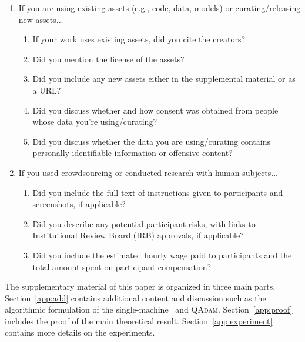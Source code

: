 \documentclass[11pt]{article}
\begin{document}
\begin{enumerate}
\item If you are using existing assets (e.g., code, data, models) or curating/releasing new assets...
\begin{enumerate}
  \item If your work uses existing assets, did you cite the creators?
    \answerYes{}
  \item Did you mention the license of the assets?
    \answerNA{}
  \item Did you include any new assets either in the supplemental material or as a URL?
    \answerNA{}
  \item Did you discuss whether and how consent was obtained from people whose data you're using/curating?
    \answerNA{}
  \item Did you discuss whether the data you are using/curating contains personally identifiable information or offensive content?
    \answerNA{}
\end{enumerate}

\item If you used crowdsourcing or conducted research with human subjects...
\begin{enumerate}
  \item Did you include the full text of instructions given to participants and screenshots, if applicable?
    \answerNA{}
  \item Did you describe any potential participant risks, with links to Institutional Review Board (IRB) approvals, if applicable?
    \answerNA{}
  \item Did you include the estimated hourly wage paid to participants and the total amount spent on participant compensation?
    \answerNA{}
\end{enumerate}

\end{enumerate}


\clearpage
\appendix 

  \hsize\textwidth
  \linewidth\hsize {}
 \bottomtitlebar 

The supplementary material of this paper is organized in three main parts. Section~\ref{app:add} contains additional content and discussion such as the algorithmic formulation of the single-machine \algo\ and \textsc{QAdam}. Section~\ref{app:proof} includes the proof of the main theoretical result. Section~\ref{app:experiment} contains more details on the experiments.
\end{document}
